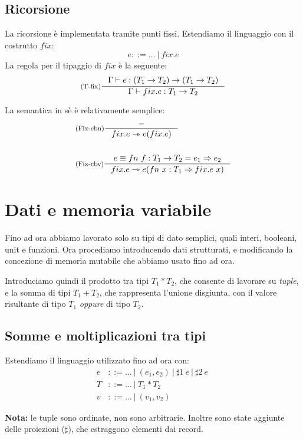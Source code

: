 \documentclass[a4paper, 11pt]{article}
\newcommand{\type}{\Gamma \vdash}
\begin{document}
\subsection{Ricorsione}
La ricorsione è implementata tramite punti fissi\footnotemark.  Estendiamo il linguaggio con il costrutto $fix$: \[ e::= \dots\ |\ fix.e \]
La regola per il tipaggio di $fix$ è la seguente: 
\[ 
	\inference[(T-fix)]{\type e: (T_1 \to T_2) \to (T_1 \to T_2)}{\type fix.e:T_1 \to T_2} 
\]


La semantica in sè è relativamente semplice: 
\begin{align*}
	&\inference[(Fix-cbn)]{-}{fix.e \rightarrowtriangle e(fix.e)} \\ \\
	&\inference[(Fix-cbv)]{e \equiv fn\ f: T_1 \to T_2 = e_1 \Rightarrow e_2}{fix.e \rightarrowtriangle e(fn\ x :T_1 \Rightarrow fix.e\ x)}
\end{align*}

\newpage
\section{Dati e memoria variabile}

Fino ad ora abbiamo lavorato solo su tipi di dato semplici, quali interi, booleani, unit e funzioni. Ora procediamo introducendo dati strutturati, e modificando la concezione di memoria mutabile che abbiamo usato fino ad ora. 

Introduciamo quindi il prodotto tra tipi $T_1 * T_2$, che consente di lavorare su \textit{tuple}, e la somma di tipi $T_1 + T_2$, che rappresenta l'unione disgiunta, con il valore risultante di tipo $T_1$ \textit{oppure} di tipo $T_2$.

\subsection{Somme e moltiplicazioni tra tipi}
Estendiamo il linguaggio utilizzato fino ad ora con: \begin{align*}
	e &::= \dots\ |\ (e_1,e_2)\ |\ \sharp1\ e\ |\ \sharp2\ e\ \\
	T &::= \dots\ |\ T_1 * T_2 \\
	v &::= \dots\ |\ (v_1, v_2)
\end{align*}

\textbf{Nota:} le tuple sono ordinate, non sono arbitrarie.
Inoltre sono state aggiunte delle proiezioni ($\sharp$), che estraggono elementi dai record.
\end{document}
